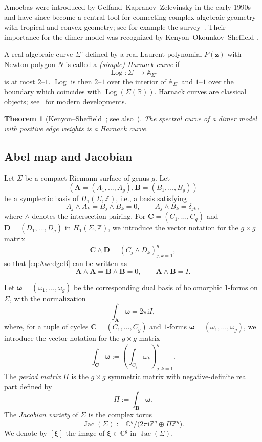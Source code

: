 \documentclass[12pt]{amsart}
\numberwithin{equation}{section}
\newtheorem{theorem}{Theorem}[section]
\theoremstyle{definition}
\newcommand{\Z}{\mathbb{Z}}
\newcommand{\C}{\mathbb{C}}
\newcommand{\R}{\mathbb{R}}
\def\Log{\operatorname{Log}}
\def\imunit{{\mathrm{i}}}
\def\openspectralcurve{{\Sigma^{\circ}}}
\def\amoeba{\mathbb A}
\def\jac{{\operatorname{Jac}}}
\def\vecptjac{\bm{\xi}}
\def\ptC{{\bm{z}}} %
\def\amoebaof#1{\amoeba_{#1}}
\def\amoebaSig{\amoebaof{\openspectralcurve}}
\def\ptCg{\vecptjac}
\def\mcurve{\Sigma}
\begin{document}
Amoebas were introduced by Gelfand--Kapranov--Zelevinsky in the early 1990s \cite{GKZ} and have since become a central tool for connecting complex algebraic geometry with tropical and convex geometry; see for example the survey~\cite{MikhalkinAmoebas}. Their importance for the dimer model was recognized by Kenyon--Okounkov--Sheffield \cite{KOS}.


A real algebraic curve $\openspectralcurve$  defined by a real Laurent polynomial $P(\ptC)$ with Newton polygon $N$ is called a \emph{(simple) Harnack curve} if
\[
\Log : \openspectralcurve \rightarrow \amoebaSig
\]
is at most $2$--$1$. $\Log$ is then $2$--$1$ over the interior of $\amoebaSig$ and $1$--$1$ over the boundary which coincides with $\Log(\mcurve(\R))$. Harnack curves are classical objects; see~\cite{MikhalkinReal, MikhalkinRullgaard} for modern developments.

\begin{theorem}[Kenyon--Sheffield~\cite{KS}; see also~\cite{KOS,KenyonOkounkovHarnack}]
\label{thm:spectral_curve_is_harnack}
The spectral curve of a dimer model with positive edge weights is a Harnack curve.
\end{theorem}


\subsection{Abel map and Jacobian}\label{sec:jacobian}

Let $\mcurve$ be a compact Riemann surface of genus $g$. Let \[(\bm A=(A_1,\dots,A_g), \bm B=(B_1,\dots,B_g))\] be a symplectic basis of $H_1(\mcurve,\Z)$, i.e., a basis satisfying
\begin{equation}
A_j \wedge A_k = B_j \wedge  B_k = 0, \qquad  A_j \wedge B_k = \delta_{jk}, \label{eq:AwedgeB}
\end{equation}
where $\wedge$ denotes the intersection pairing. For $\bm C = (C_1,\dots,C_g)$ and $\bm D = (D_1,\dots, D_g)$ in $H_1(\mcurve,\Z)$, we introduce the vector notation for the $g \times g$ matrix
\[
\bm C \wedge \bm D = \left( C_j \wedge D_k \right)_{j,k=1}^g, 
\]
so that \eqref{eq:AwedgeB} can be written as
\[
\bm A \wedge \bm A = \bm B \wedge \bm B=0, \qquad \bm A \wedge \bm B = I.
\]

Let $\bm \omega=(\omega_1,\dots,\omega_g)
$ be the corresponding dual basis of holomorphic $1$-forms on
$\mcurve$, with the normalization
\[
\int_{\bm A} \bm \omega =
2\pi\imunit I,
\]
where, for a tuple of cycles $\bm C = (C_1,\dots,C_g)$ and $1$-forms $\bm \omega = (\omega_1,\dots,\omega_g)$, we introduce the vector notation for the $g \times g$ matrix
\[
\int_{\bm C} \bm \omega := \left(\int_{C_j}\omega_k \right)_{j,k=1}^g.
\]
The \emph{period matrix} $\Pi$ is the $g \times g$ symmetric matrix with negative-definite real part defined by
\[
\Pi := \int_{\bm B} \bm \omega.
\]
The \emph{Jacobian variety} of $\mcurve$ is the complex torus
\[
\jac(\mcurve) :=  \C^{g} \big/ \big(2\pi \imunit \Z^{g} \oplus \Pi \Z^{g}\big).
\]
We denote by $[\ptCg]$ the image of $\ptCg \in \C^{g}$ in $\jac(\mcurve)$.
\end{document}

